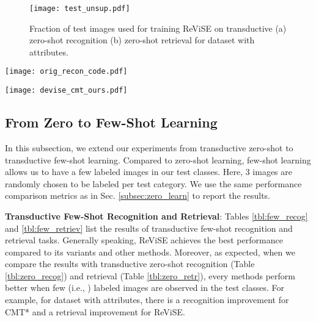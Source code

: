 {{\begin{figure}[t!]
\centering
\texttt{[image: test\_unsup.pdf]}
\caption{\footnotesize Fraction  of test images used for training ReViSE on transductive (a) zero-shot recognition (b) zero-shot retrieval for  dataset with  attributes.}
\label{fig:test_unsup}
\vspace{-3mm}
\end{figure}


}

\begin{figure*}[t!]
\vspace{-3mm}
\centering
\texttt{[image: orig\_recon\_code.pdf]}
\caption{\footnotesize (a) Original CNN features (b) Reconstructed features (c) Visual codes for  dataset in ReViSE under transductive zero-shot setting. We use  as our textual attributes for classes. Different colors denote different classes. Best viewed in colors.}
\label{fig:orig_recon_code}
\vspace{-4mm}
\end{figure*}

\begin{figure*}[t!]
\centering
\texttt{[image: devise\_cmt\_ours.pdf]}
\caption{\footnotesize Output features of : (a) DeViSE* (b) CMT* (c) ReViSE.  attributes are used on  dataset under transductive zero-shot setting. Different colors denote different classes. Best view in colors.}
\label{fig:devise_cmt_ours}
\vspace{-3mm}
\end{figure*}

\subsection{From Zero to Few-Shot Learning}
\label{subsec:few_shot}
{

In this subsection, we extend our experiments from transductive zero-shot to transductive few-shot learning. 
Compared to zero-shot learning, few-shot learning allows us to have a few labeled images in our test classes. Here, 3 images are randomly chosen to be labeled per test category. We use the same performance comparison metrics as in Sec. \ref{subsec:zero_learn} to report the results.

\vspace{0.1in}
\hspace{-5mm} {\bf Transductive Few-Shot Recognition and Retrieval}:
Tables \ref{tbl:few_recog} and \ref{tbl:few_retriev} list the results of transductive few-shot recognition and retrieval tasks. Generally speaking, ReViSE achieves the best performance compared to its variants and other methods. Moreover, as expected, when we compare the results with transductive zero-shot recognition (Table \ref{tbl:zero_recog}) and retrieval (Table \ref{tbl:zero_retr}), every methods perform better when few (i.e., ) labeled images are observed in the test classes. For example, for  dataset with  attributes, there is a  recognition improvement for CMT* and a  retrieval improvement for ReViSE. 

}}
